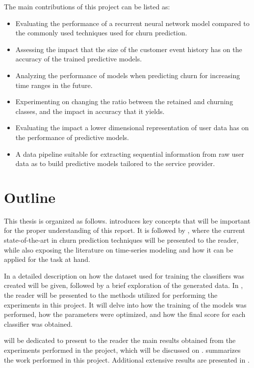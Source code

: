 \documentclass{kththesis}
\begin{document}
The main contributions of this project can be listed as:

\begin{itemize}
\item Evaluating the performance of a recurrent neural network model compared to the commonly used techniques used for churn prediction.
\item Assessing the impact that the size of the customer event history has on the accuracy of the trained predictive models.
\item Analyzing the performance of models when predicting churn for increasing time ranges in the future.
\item Experimenting on changing the ratio between the retained and churning classes, and the impact in accuracy that it yields.
\item Evaluating the impact a lower dimensional representation of user data has on the performance of predictive models.
\item A data pipeline suitable for extracting sequential information from raw user data as to build predictive models tailored to the service provider.
\end{itemize}

\section{Outline}

This thesis is organized as follows.  introduces key concepts that will be important for the proper understanding of this report. It is followed by , where the current state-of-the-art in churn prediction techniques will be presented to the reader, while also exposing the literature on time-series modeling and how it can be applied for the task at hand. 

In  a detailed description on how the dataset used for training the classifiers was created will be given, followed by a brief exploration of the generated data. In , the reader will be presented to the methods utilized for performing the experiments in this project. It will delve into how the training of the models was performed, how the parameters were optimized, and how the final score for each classifier was obtained.

 will be dedicated to present to the reader the main results obtained from the experiments performed in the project, which will be discussed on .  summarizes the work performed in this project. Additional extensive results are presented in . 
\end{document}
